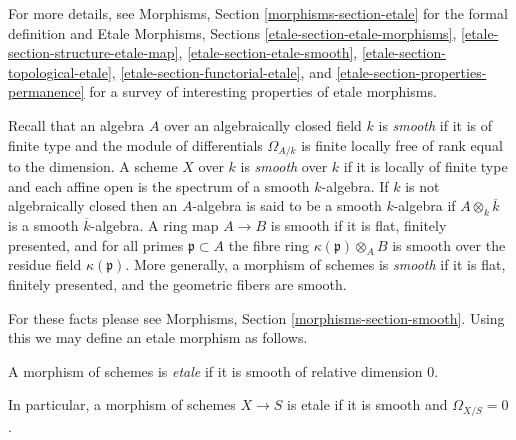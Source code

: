 \noindent
For more details, see
Morphisms, Section \ref{morphisms-section-etale}
for the formal definition and
Etale Morphisms, Sections
\ref{etale-section-etale-morphisms},
\ref{etale-section-structure-etale-map},
\ref{etale-section-etale-smooth},
\ref{etale-section-topological-etale},
\ref{etale-section-functorial-etale}, and
\ref{etale-section-properties-permanence}
for a survey of interesting properties of etale morphisms.

\medskip\noindent
Recall that an algebra $A$ over an algebraically closed field $k$ is
{\it smooth} if it is of finite type and the module of differentials
$\Omega_{A/k}$ is finite locally free of rank equal to the dimension.
A scheme $X$ over $k$ is {\it smooth} over $k$ if it is locally of finite
type and each affine open is the spectrum of a smooth $k$-algebra.
If $k$ is not algebraically closed then an $A$-algebra is said to be
a smooth $k$-algebra if $A \otimes_k \overline{k}$ is a smooth
$\overline{k}$-algebra. A ring map $A \to B$ is smooth if it is
flat, finitely presented, and for all primes $\mathfrak p \subset A$
the fibre ring $\kappa(\mathfrak p) \otimes_A B$ is smooth over the residue
field $\kappa(\mathfrak p)$. More generally, a morphism of schemes is
{\it smooth} if it is flat, finitely presented, and the geometric fibers
are smooth.

\medskip\noindent
For these facts please see
Morphisms, Section \ref{morphisms-section-smooth}.
Using this we may define an etale morphism as follows.

\begin{definition}
\label{definition-etale-morphism}
A morphism of schemes is {\it etale} if it is smooth of relative dimension 0.
\end{definition}

\noindent
In particular, a morphism of schemes $X \to S$ is etale if it is smooth
and $\Omega_{X/S} = 0$.

